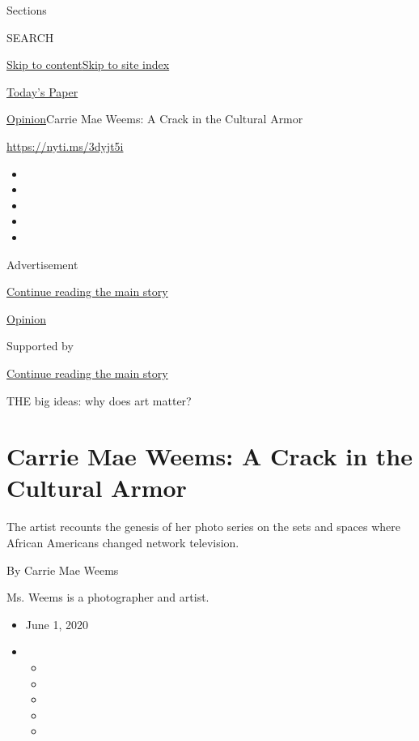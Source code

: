 Sections

SEARCH

\protect\hyperlink{site-content}{Skip to
content}\protect\hyperlink{site-index}{Skip to site index}

\href{https://myaccount.nytimes.com/auth/login?response_type=cookie\&client_id=vi}{}

\href{https://www.nytimes.com/section/todayspaper}{Today's Paper}

\href{/section/opinion}{Opinion}\textbar{}Carrie Mae Weems: A Crack in
the Cultural Armor

\href{https://nyti.ms/3dyjt5i}{https://nyti.ms/3dyjt5i}

\begin{itemize}
\item
\item
\item
\item
\item
\end{itemize}

Advertisement

\protect\hyperlink{after-top}{Continue reading the main story}

\href{/section/opinion}{Opinion}

Supported by

\protect\hyperlink{after-sponsor}{Continue reading the main story}

THE big ideas: why does art matter?

\hypertarget{carrie-mae-weems-a-crack-in-the-cultural-armor}{%
\section{Carrie Mae Weems: A Crack in the Cultural
Armor}\label{carrie-mae-weems-a-crack-in-the-cultural-armor}}

The artist recounts the genesis of her photo series on the sets and
spaces where African Americans changed network television.

By Carrie Mae Weems

Ms. Weems is a photographer and artist.

\begin{itemize}
\item
  June 1, 2020
\item
  \begin{itemize}
  \item
  \item
  \item
  \item
  \item
  \end{itemize}
\end{itemize}

